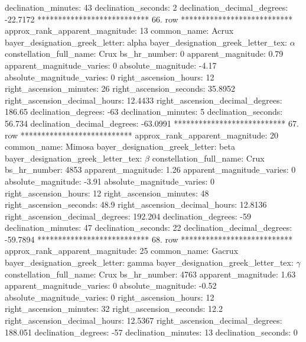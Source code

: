                declination_minutes: 43
               declination_seconds: 2
       declination_decimal_degrees: -22.7172
*************************** 66. row ***************************
    approx_rank_apparent_magnitude: 13
                       common_name: Acrux
    bayer_designation_greek_letter: alpha
bayer_designation_greek_letter_tex: $\alpha$
           constellation_full_name: Crux
                      bs_hr_number: 0
                apparent_magnitude: 0.79
         apparent_magnitude_varies: 0
                absolute_magnitude: -4.17
         absolute_magnitude_varies: 0
             right_ascension_hours: 12
           right_ascension_minutes: 26
           right_ascension_seconds: 35.8952
     right_ascension_decimal_hours: 12.4433
   right_ascension_decimal_degrees: 186.65
               declination_degrees: -63
               declination_minutes: 5
               declination_seconds: 56.734
       declination_decimal_degrees: -63.0991
*************************** 67. row ***************************
    approx_rank_apparent_magnitude: 20
                       common_name: Mimosa
    bayer_designation_greek_letter: beta
bayer_designation_greek_letter_tex: $\beta$
           constellation_full_name: Crux
                      bs_hr_number: 4853
                apparent_magnitude: 1.26
         apparent_magnitude_varies: 0
                absolute_magnitude: -3.91
         absolute_magnitude_varies: 0
             right_ascension_hours: 12
           right_ascension_minutes: 48
           right_ascension_seconds: 48.9
     right_ascension_decimal_hours: 12.8136
   right_ascension_decimal_degrees: 192.204
               declination_degrees: -59
               declination_minutes: 47
               declination_seconds: 22
       declination_decimal_degrees: -59.7894
*************************** 68. row ***************************
    approx_rank_apparent_magnitude: 25
                       common_name: Gacrux
    bayer_designation_greek_letter: gamma
bayer_designation_greek_letter_tex: $\gamma$
           constellation_full_name: Crux
                      bs_hr_number: 4763
                apparent_magnitude: 1.63
         apparent_magnitude_varies: 0
                absolute_magnitude: -0.52
         absolute_magnitude_varies: 0
             right_ascension_hours: 12
           right_ascension_minutes: 32
           right_ascension_seconds: 12.2
     right_ascension_decimal_hours: 12.5367
   right_ascension_decimal_degrees: 188.051
               declination_degrees: -57
               declination_minutes: 13
               declination_seconds: 0

